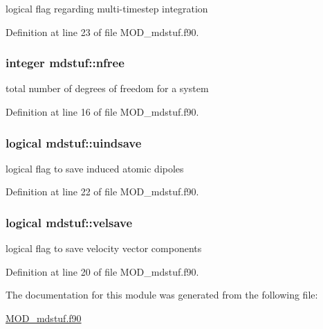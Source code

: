 logical flag regarding multi-\/timestep integration 



Definition at line 23 of file M\-O\-D\-\_\-mdstuf.\-f90.

\hypertarget{classmdstuf_a83013e704fb5b162d68c4c290c84ee00}{
\subsubsection[{nfree}]{\setlength{\rightskip}{0pt plus 5cm}integer mdstuf\-::nfree}}\label{classmdstuf_a83013e704fb5b162d68c4c290c84ee00}


total number of degrees of freedom for a system 



Definition at line 16 of file M\-O\-D\-\_\-mdstuf.\-f90.

\hypertarget{classmdstuf_a6d1ab76dd4c24b9372a1a5e581fa11ad}{
\subsubsection[{uindsave}]{\setlength{\rightskip}{0pt plus 5cm}logical mdstuf\-::uindsave}}\label{classmdstuf_a6d1ab76dd4c24b9372a1a5e581fa11ad}


logical flag to save induced atomic dipoles 



Definition at line 22 of file M\-O\-D\-\_\-mdstuf.\-f90.

\hypertarget{classmdstuf_a75b87ba4fc2eedf02a7c5951e00eb545}{
\subsubsection[{velsave}]{\setlength{\rightskip}{0pt plus 5cm}logical mdstuf\-::velsave}}\label{classmdstuf_a75b87ba4fc2eedf02a7c5951e00eb545}


logical flag to save velocity vector components 



Definition at line 20 of file M\-O\-D\-\_\-mdstuf.\-f90.



The documentation for this module was generated from the following file\-:\begin{DoxyCompactItemize}
\item 
\hyperlink{MOD__mdstuf_8f90}{M\-O\-D\-\_\-mdstuf.\-f90}\end{DoxyCompactItemize}
